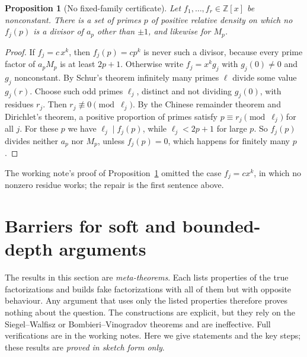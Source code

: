 \documentclass[11pt]{amsart}
\newtheorem{proposition}[theorem]{Proposition}
\theoremstyle{definition}
\theoremstyle{remark}
\newcommand{\Z}{\mathbb{Z}}
\begin{document}
\begin{proposition}[No fixed-family certificate]\label{prop:nocert}
Let $f_1,\dots,f_r\in\Z[x]$ be nonconstant. There is a set of primes $p$ of positive relative density on which no
$f_j(p)$ is a divisor of $a_p$ other than $\pm1$, and likewise for $M_p$.
\end{proposition}
\begin{proof}
If $f_j=c\,x^k$, then $f_j(p)=cp^k$ is never such a divisor, because every prime factor of $a_pM_p$ is at least
$2p+1$. Otherwise write $f_j=x^kg_j$ with $g_j(0)\ne0$ and $g_j$ nonconstant. By Schur's theorem infinitely many primes
$\ell$ divide some value $g_j(r)$. Choose such odd primes $\ell_j$, distinct and not dividing $g_j(0)$, with residues
$r_j$. Then $r_j\not\equiv0\pmod{\ell_j}$. By the Chinese remainder theorem and Dirichlet's theorem, a positive proportion of primes satisfy
$p\equiv r_j\pmod{\ell_j}$ for all $j$. For these $p$ we have $\ell_j\mid f_j(p)$, while $\ell_j<2p+1$ for large $p$. So
$f_j(p)$ divides neither $a_p$ nor $M_p$, unless $f_j(p)=0$, which happens for finitely many $p$.
\end{proof}

The working note's proof of Proposition~\ref{prop:nocert} omitted the case $f_j=cx^k$, in which no
nonzero residue works; the repair is the first sentence above.

\section{Barriers for soft and bounded-depth arguments}\label{sec:barriers}
The results in this section are \emph{meta-theorems}. Each lists properties of the true factorizations and builds
fake factorizations with all of them but with opposite behaviour. Any argument that uses only the listed properties
therefore proves nothing about the question. The constructions are explicit, but they rely on the
Siegel--Walfisz or Bombieri--Vinogradov theorems and are ineffective. Full verifications are in the working notes.
Here we give statements and the key steps; these results are \emph{proved in sketch form only}.
\end{document}
